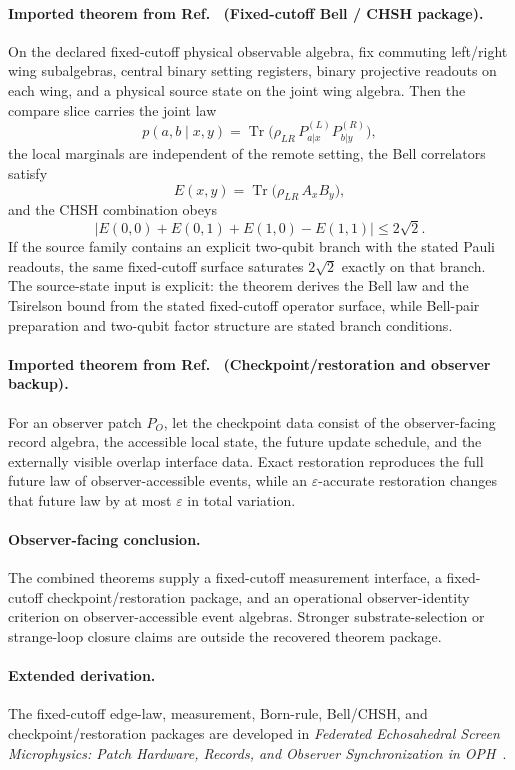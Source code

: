 \paragraph{Imported theorem from Ref.~\cite{ophmicrophysics} (Fixed-cutoff Bell / CHSH package).}
On the declared fixed-cutoff physical observable algebra, fix commuting left/right wing
subalgebras, central binary setting registers, binary projective readouts on each wing, and a
physical source state on the joint wing algebra. Then the compare slice carries the joint law
\[
p(a,b\mid x,y)
=
\operatorname{Tr}\!\bigl(\rho_{LR}\,P_{a|x}^{(L)}P_{b|y}^{(R)}\bigr),
\]
the local marginals are independent of the remote setting, the Bell correlators satisfy
\[
E(x,y)=\operatorname{Tr}\!\bigl(\rho_{LR}\,A_xB_y\bigr),
\]
and the CHSH combination obeys
\[
\bigl|E(0,0)+E(0,1)+E(1,0)-E(1,1)\bigr|
\le
2\sqrt2.
\]
If the source family contains an explicit two-qubit branch with the stated Pauli readouts, the
same fixed-cutoff surface saturates \(2\sqrt2\) exactly on that branch. The source-state input
is explicit: the theorem derives the Bell law and the Tsirelson bound from the stated
fixed-cutoff operator surface, while Bell-pair preparation and two-qubit factor structure are
stated branch conditions.

\paragraph{Imported theorem from Ref.~\cite{ophmicrophysics} (Checkpoint/restoration and observer backup).}
For an observer patch \(P_O\), let the checkpoint data consist of the observer-facing record
algebra, the accessible local state, the future update schedule, and the externally visible
overlap interface data. Exact restoration reproduces the full future law of observer-accessible
events, while an \(\varepsilon\)-accurate restoration changes that future law by at most
\(\varepsilon\) in total variation.

\paragraph{Observer-facing conclusion.}
The combined theorems supply a fixed-cutoff measurement interface,
a fixed-cutoff checkpoint/restoration package, and an operational observer-identity criterion on
observer-accessible event algebras. Stronger substrate-selection or strange-loop closure claims
are outside the recovered theorem package.

\paragraph{Extended derivation.}
The fixed-cutoff edge-law, measurement, Born-rule, Bell/CHSH, and checkpoint/restoration packages are developed in
\emph{Federated Echosahedral Screen Microphysics: Patch Hardware, Records, and Observer Synchronization in OPH}~\cite{ophmicrophysics}.

